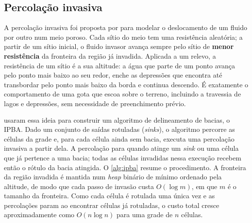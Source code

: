 \subsection{Percolação invasiva}

A percolação invasiva foi proposta por  para modelar o deslocamento de um fluido por outro num meio poroso. Cada sítio do meio tem uma resistência aleatória; a partir de um sítio inicial, o fluido invasor avança sempre pelo sítio de \textbf{menor resistência} da fronteira da região já invadida. Aplicada a um relevo, a resistência de um sítio é a sua altitude: a água que parte de um ponto avança pelo ponto mais baixo ao seu redor, enche as depressões que encontra até transbordar pelo ponto mais baixo da borda e continua descendo. É exatamente o comportamento de uma gota que escoa sobre o terreno, incluindo a travessia de lagos e depressões, sem necessidade de preenchimento prévio.

 usaram essa ideia para construir um algoritmo de delineamento de bacias, o \acrshort{IPBA}. Dado um conjunto de saídas rotuladas (\textit{sinks}), o algoritmo percorre as células da grade e, para cada célula ainda sem bacia, executa uma percolação invasiva a partir dela. A percolação para quando atinge um \textit{sink} ou uma célula que já pertence a uma bacia; todas as células invadidas nessa execução recebem então o rótulo da bacia atingida. O \autoref{alg:ipba} resume o procedimento. A fronteira da região invadida é mantida num \textit{heap} binário de mínimo ordenado pela altitude, de modo que cada passo de invasão custa $O(\log m)$, em que $m$ é o tamanho da fronteira. Como cada célula é rotulada uma única vez e as percolações param ao encontrar células já rotuladas, o custo total cresce aproximadamente como $O(n \log n)$ para uma grade de $n$ células.

\begin{algorithm}[ht!]
	\SetSpacedAlgorithm
	\caption{\label{alg:ipba}Delineamento de bacias por percolação invasiva (IPBA)}
\end{algorithm}

